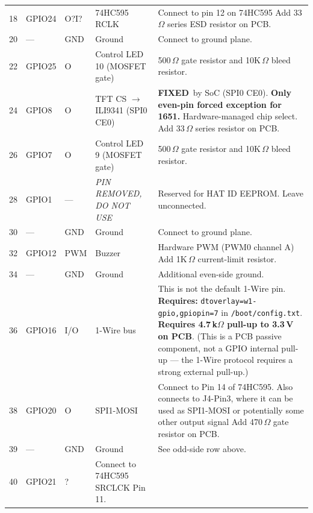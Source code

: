 \documentclass[11pt,a4paper]{article}
\newcommand{\fixed}{\textbf{FIXED}}
\newcommand{\na}{---}
\begin{document}
\begin{longtable}{C{0.9cm} C{1.3cm} C{0.8cm} L{3.5cm} L{7.5cm}}
  18 & GPIO24 & O?I? & 74HC595 RCLK &
    Connect to pin 12 on 74HC595 
    Add 33\,$\Omega$ series ESD resistor on PCB.\\

  20 & \na & GND & Ground &
    Connect to ground plane.\\

  22 & GPIO25 & O & Control LED 10 (MOSFET gate) &
    500\,$\Omega$ gate resistor and 10K\,$\Omega$ bleed resistor.\\
  
  24 & GPIO8 & O & TFT CS $\to$ ILI9341 (SPI0 CE0) &
    \fixed\ by SoC (SPI0 CE0). \textbf{Only even-pin forced exception for 1651.}
    Hardware-managed chip select.
    Add 33\,$\Omega$ series resistor on PCB. \\

  26 & GPIO7 & O & Control LED 9 (MOSFET gate) &
  500\,$\Omega$ gate resistor and 10K\,$\Omega$ bleed resistor.\\
  

  28 & GPIO1 & \na & \textit{PIN REMOVED, DO NOT USE} &
    Reserved for HAT ID EEPROM. Leave unconnected. \\

  30 & \na & GND & Ground &
    Connect to ground plane. \\

  32 & GPIO12 & PWM & Buzzer &
    Hardware PWM  (PWM0 channel A) 
    Add 1K\,$\Omega$ current-limit resistor.\\

  34 & \na & GND & Ground &
    Additional even-side ground. \\

  36 & GPIO16 & I/O & 1-Wire bus &
    This is not the default 1-Wire pin.
	\textbf{Requires:} \texttt{dtoverlay=w1-gpio,gpiopin=7} in \texttt{/boot/config.txt}.
	\textbf{Requires 4.7\,k$\Omega$ pull-up to 3.3\,V on PCB}.
	(This is a PCB passive component, not a GPIO internal pull-up --- 
	the 1-Wire protocol requires a strong external pull-up.)\\
		  
  38 & GPIO20 & O & SPI1-MOSI &
    Connect to Pin 14 of 74HC595.  Also connects to J4-Pin3, where it can be used as SPI1-MOSI or potentially some other output signal
    Add 470\,$\Omega$ gate resistor on PCB. \\

  39 & \na & GND & Ground &
    See odd-side row above. \\

  40 & GPIO21 & ? & Connect to 74HC595 SRCLCK Pin 11. \\

\end{longtable}
\end{document}
